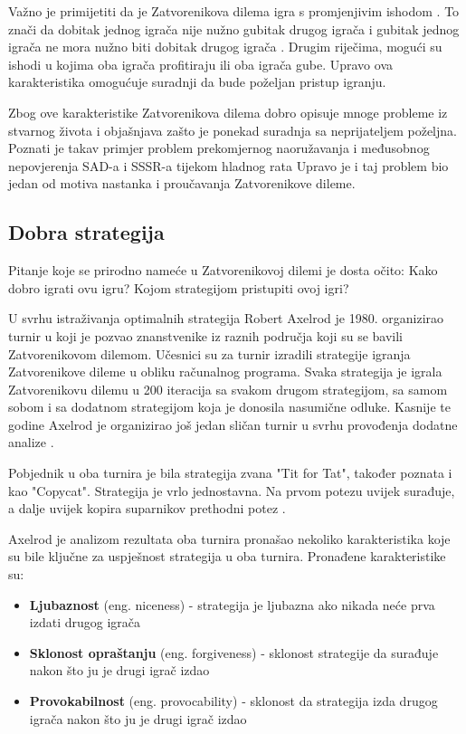 \documentclass[zavrsnirad]{fer}
\begin{document}
	Važno je primijetiti da je Zatvorenikova dilema igra s promjenjivim ishodom \cite{PrisDilemmaHrEnc}. To znači da dobitak jednog igrača nije nužno gubitak drugog igrača i gubitak jednog igrača ne mora nužno biti dobitak drugog igrača \cite{igraHrEnc}. Drugim riječima, mogući su ishodi u kojima oba igrača profitiraju ili oba igrača gube. Upravo ova karakteristika omogućuje suradnji da bude poželjan pristup igranju. 
	 
	Zbog ove karakteristike Zatvorenikova dilema dobro opisuje mnoge probleme iz stvarnog života i objašnjava zašto je ponekad suradnja sa neprijateljem poželjna. Poznati je takav primjer problem prekomjernog naoružavanja i međusobnog nepovjerenja SAD-a i SSSR-a tijekom hladnog rata \cite{1980Axelrod1} Upravo je i taj problem bio jedan od motiva nastanka i proučavanja Zatvorenikove dileme.

	\subsection{Dobra strategija}
	
		Pitanje koje se prirodno nameće u Zatvorenikovoj dilemi je dosta očito: Kako dobro igrati ovu igru? Kojom strategijom pristupiti ovoj igri?

		U svrhu istraživanja optimalnih strategija Robert Axelrod je 1980. organizirao turnir \cite{1980Axelrod1} u koji je pozvao znanstvenike iz raznih područja koji su se bavili Zatvorenikovom dilemom. Učesnici su za turnir izradili strategije igranja Zatvorenikove dileme u obliku računalnog programa. Svaka strategija je igrala Zatvorenikovu dilemu u 200 iteracija sa svakom drugom strategijom, sa samom sobom i sa dodatnom strategijom koja je donosila nasumične odluke. Kasnije te godine Axelrod je organizirao još jedan sličan turnir u svrhu provođenja dodatne analize \cite{1980Axelrod2}.
	
		Pobjednik u oba turnira je bila strategija zvana "Tit for Tat", također poznata i kao "Copycat". Strategija je vrlo jednostavna. Na prvom potezu uvijek surađuje, a dalje uvijek kopira suparnikov prethodni potez \cite{1980Axelrod1}.
	
		Axelrod je analizom rezultata oba turnira pronašao nekoliko karakteristika koje su bile ključne za uspješnost strategija u oba turnira. Pronađene karakteristike su:
	
		\begin{itemize}
			\item \textbf{Ljubaznost} (eng. niceness) \cite{1980Axelrod1} - strategija je ljubazna ako nikada neće prva izdati drugog igrača
			\item \textbf{Sklonost opraštanju} (eng. forgiveness) \cite{1980Axelrod1} - sklonost strategije da surađuje nakon što ju je drugi igrač izdao
			\item \textbf{Provokabilnost} (eng. provocability) \cite{1980Axelrod2} - sklonost da strategija izda drugog igrača nakon što ju je drugi igrač izdao
		\end{itemize}
	
\end{document}
